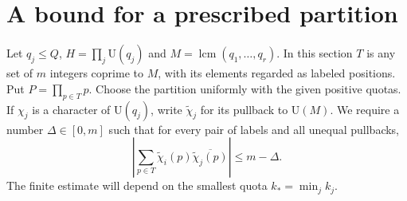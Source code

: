 \documentclass[11pt]{article}
\newcommand{\U}{\mathrm U}
\begin{document}
\section{A bound for a prescribed partition}
Let $q_j\le Q$, $H=\prod_j\U(q_j)$ and $M=\operatorname{lcm}(q_1,\ldots,q_r)$. In this section $T$ is any set of $m$ integers coprime to $M$, with its elements regarded as labeled positions. Put $P=\prod_{p\in T}p$. Choose the partition uniformly with the given positive quotas. If $\chi_j$ is a character of $\U(q_j)$, write $\widetilde\chi_j$ for its pullback to $\U(M)$. We require a number $\Delta\in[0,m]$ such that for every pair of labels and all unequal pullbacks,
\begin{equation}\label{eq:gap}
 \left|\sum_{p\in T}\widetilde\chi_i(p)\overline{\widetilde\chi_j(p)}\right|
 \le m-\Delta .
\end{equation}
The finite estimate will depend on the smallest quota $k_*=\min_j k_j$.
\end{document}
